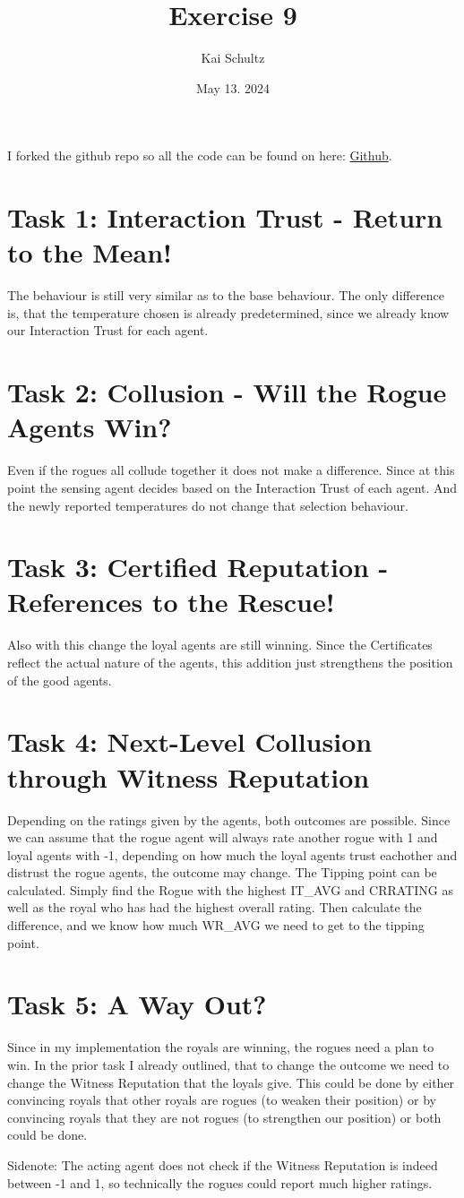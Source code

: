 \documentclass[11pt]{article}
\title{Exercise 9}
\author{Kai Schultz}
\date{May 13. 2024} %
\begin{document}
\maketitle
I forked the github repo so all the code can be found on here: \href{https://github.com/KaiTries/exercise-9}{Github}.

\section*{Task 1: Interaction Trust - Return to the Mean!}
The behaviour is still very similar as to the base behaviour. The only difference is, that the temperature chosen is already predetermined, since we already know our Interaction Trust for each agent. 

\section*{Task 2: Collusion - Will the Rogue Agents Win?}
Even if the rogues all collude together it does not make a difference. Since at this point the sensing agent decides based on the Interaction Trust of each agent. And the newly reported temperatures do not change that selection behaviour.

\section*{Task 3: Certified Reputation - References to the Rescue!}
Also with this change the loyal agents are still winning. Since the Certificates reflect the actual nature of the agents, this addition just strengthens the position of the good agents.

\section*{Task 4: Next-Level Collusion through Witness Reputation}
Depending on the ratings given by the agents, both outcomes are possible. Since we can assume that the rogue agent will always rate another rogue with 1 and loyal agents with -1, depending on how much the loyal agents trust eachother and distrust the rogue agents, the outcome may change. The Tipping point can be calculated. Simply find the Rogue with the highest IT\_AVG and CRRATING as well as the royal who has had the highest overall rating. Then calculate the difference, and we know how much WR\_AVG we need to get to the tipping point.

\section*{Task 5: A Way Out?}
Since in my implementation the royals are winning, the rogues need a plan to win. In the prior task I already outlined, that to change the outcome we need to change the Witness Reputation that the loyals give. This could be done by either convincing royals that other royals are rogues (to weaken their position) or by convincing royals that they are not rogues (to strengthen our position) or both could be done. 

Sidenote: The acting agent does not check if the Witness Reputation is indeed between -1 and 1, so technically the rogues could report much higher ratings.
\end{document}
